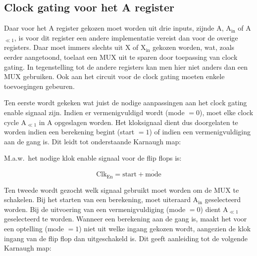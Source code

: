 \subsection{Clock gating voor het A register}

Daar voor het A register gekozen moet worden uit drie  inputs, zijnde A, A$_{\text{in}}$ of A$_{\ll 1}$, is voor dit register een andere implementatie vereist dan voor de overige registers. Daar moet immers slechts uit X of X$_{\text{in}}$ gekozen worden, wat, zoals eerder aangetoond, toelaat een MUX uit te sparen door toepassing van clock gating. In tegenstelling tot de andere registers kan men hier niet anders dan een MUX gebruiken. Ook aan het circuit voor de clock gating moeten enkele toevoegingen gebeuren.

Ten eerste wordt gekeken wat juist de nodige aanpassingen aan het clock gating enable signaal zijn. Indien er vermenigvuldigd wordt (mode $= 0$), moet elke clock cycle A$_{\ll 1}$ in A opgeslagen worden. Het kloksignaal dient dus doorgelaten te worden indien een berekening begint (start $= 1$) of indien een vermenigvuldiging aan de gang is. Dit leidt tot onderstaande Karnaugh map:


\vspace{\textfloatsep}
\begin{minipage}{\linewidth}
	\begin{center}
	\end{center}
\end{minipage}
\vspace{\textfloatsep}

M.a.w.\ het nodige klok enable signaal voor de flip flops is:

\[ \text{Clk}_{\text{En}} = \text{start} + \overline{\text{mode}} \]

Ten tweede wordt gezocht welk signaal gebruikt moet worden om de MUX te schakelen. Bij het starten van een berekening, moet uiteraard A$_{\text{in}}$ geselecteerd worden. Bij de uitvoering van een vermenigvuldiging (mode $= 0$) dient A$_{\ll 1}$ geselecteerd te worden. Wanneer een berekening aan de gang is, maakt het voor een optelling (mode $= 1$) niet uit welke ingang gekozen wordt, aangezien de klok ingang van de flip flop dan uitgeschakeld is. Dit geeft aanleiding tot de volgende Karnaugh map:

